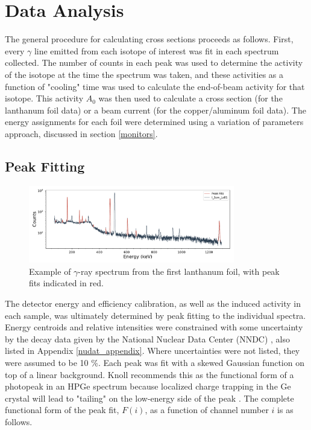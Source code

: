 \documentclass[aps,superscriptaddress,twocolumn,secnumarabic,balancelastpage,amsmath,amssymb,nofootinbib,floatfix]{revtex4-1}
\begin{document}
\section{Data Analysis}
The general procedure for calculating cross sections proceeds as follows.  First, every $\gamma$ line emitted from each isotope of interest was fit in each spectrum collected.  The number of counts in each peak was used to determine the activity of the isotope at the time the spectrum was taken, and these activities as a function of "cooling" time was used to calculate the end-of-beam activity for that isotope.  This activity $A_0$ was then used to calculate a cross section (for the lanthanum foil data) or a beam current (for the copper/aluminum foil data).  The energy assignments for each foil were determined using a variation of parameters approach, discussed in section \ref{monitors}.

\subsection{Peak Fitting}

\begin{figure}[htb]
\includegraphics[width=9cm]{peak_fits/I_1cm_La01_fits}
\caption{Example of $\gamma$-ray spectrum from the first lanthanum foil, with peak fits indicated in red.
}
\label{fig:peak_fit}
\end{figure}

The detector energy and efficiency calibration, as well as the induced activity in each sample, was ultimately determined by peak fitting to the individual spectra.  Energy centroids and relative intensities were constrained with some uncertainty by the decay data given by the National Nuclear Data Center (NNDC) \cite{ensdf}, also listed in Appendix \ref{nudat_appendix}.  Where uncertainties were not listed, they were assumed to be 10 \%.  Each peak was fit with a skewed Gaussian function on top of a linear background. Knoll recommends this as the functional form of a photopeak in an HPGe spectrum because localized charge trapping in the Ge crystal will lead to "tailing" on the low-energy side of the peak \cite{Knoll}.  The complete functional form of the peak fit, $F(i)$, as a function of channel number $i$ is as follows.
\end{document}
